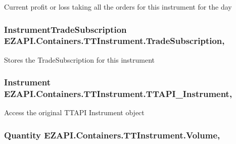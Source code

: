 Current profit or loss taking all the orders for this instrument for the day 

\hypertarget{class_e_z_a_p_i_1_1_containers_1_1_t_t_instrument_a46b5d383d32fccba805b1d38edbbf27d}{
\subsubsection[{Trade\-Subscription}]{\setlength{\rightskip}{0pt plus 5cm}Instrument\-Trade\-Subscription E\-Z\-A\-P\-I.\-Containers.\-T\-T\-Instrument.\-Trade\-Subscription\hspace{0.3cm}{\ttfamily [get]}, {\ttfamily [set]}}}\label{class_e_z_a_p_i_1_1_containers_1_1_t_t_instrument_a46b5d383d32fccba805b1d38edbbf27d}


Stores the Trade\-Subscription for this instrument 

\hypertarget{class_e_z_a_p_i_1_1_containers_1_1_t_t_instrument_a0f1e4c47d7b6512a6f605826b2d13fc1}{
\subsubsection[{T\-T\-A\-P\-I\-\_\-\-Instrument}]{\setlength{\rightskip}{0pt plus 5cm}Instrument E\-Z\-A\-P\-I.\-Containers.\-T\-T\-Instrument.\-T\-T\-A\-P\-I\-\_\-\-Instrument\hspace{0.3cm}{\ttfamily [get]}, {\ttfamily [set]}}}\label{class_e_z_a_p_i_1_1_containers_1_1_t_t_instrument_a0f1e4c47d7b6512a6f605826b2d13fc1}


Access the original T\-T\-A\-P\-I Instrument object 

\hypertarget{class_e_z_a_p_i_1_1_containers_1_1_t_t_instrument_a70c62e99148ab0ddf115649e1610daa8}{
\subsubsection[{Volume}]{\setlength{\rightskip}{0pt plus 5cm}Quantity E\-Z\-A\-P\-I.\-Containers.\-T\-T\-Instrument.\-Volume\hspace{0.3cm}{\ttfamily [get]}, {\ttfamily [set]}}}\label{class_e_z_a_p_i_1_1_containers_1_1_t_t_instrument_a70c62e99148ab0ddf115649e1610daa8}


